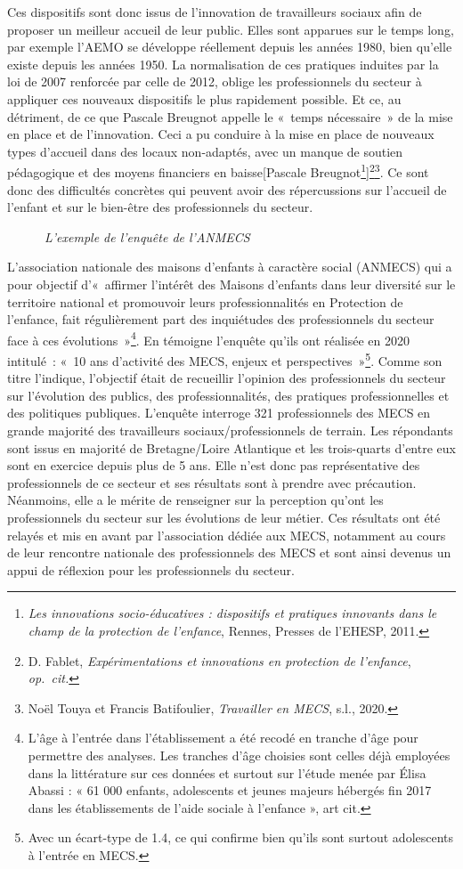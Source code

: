 \documentclass[
  12,
  a4paper,
]{report}
\begin{document}
Ces dispositifs sont donc issus de l'innovation de travailleurs sociaux
afin de proposer un meilleur accueil de leur public. Elles sont apparues
sur le temps long, par exemple l'AEMO se développe réellement depuis les
années 1980, bien qu'elle existe depuis les années 1950. La
normalisation de ces pratiques induites par la loi de 2007 renforcée par
celle de 2012, oblige les professionnels du secteur à appliquer ces
nouveaux dispositifs le plus rapidement possible. Et ce, au détriment,
de ce que Pascale Breugnot appelle le «~temps nécessaire~» de la mise en
place et de l'innovation. Ceci a pu conduire à la mise en place de
nouveaux types d'accueil dans des locaux non-adaptés, avec un manque de
soutien pédagogique et des moyens financiers en baisse{[}Pascale
Breugnot\footnote{\emph{Les innovations socio-éducatives : dispositifs
  et pratiques innovants dans le champ de la protection de l'enfance},
  {Rennes}, {Presses de l'EHESP}, 2011.}{]}\footnote{D. Fablet,
  \emph{Expérimentations et innovations en protection de l'enfance},
  \emph{op.~cit.}}\footnote{Noël Touya et Francis Batifoulier,
  \emph{Travailler en MECS}, s.l., 2020.}. Ce sont donc des difficultés
concrètes qui peuvent avoir des répercussions sur l'accueil de l'enfant
et sur le bien-être des professionnels du secteur.

~~~~~~\emph{L'exemple de l'enquête de l'ANMECS}

L'association nationale des maisons d'enfants à caractère social
(ANMECS) qui a pour objectif d'«~affirmer l'intérêt des Maisons
d'enfants dans leur diversité sur le territoire national et promouvoir
leurs professionnalités en Protection de l'enfance, fait régulièrement
part des inquiétudes des professionnels du secteur face à ces
évolutions~»\footnote{L'âge à l'entrée dans l'établissement a été recodé
  en tranche d'âge pour permettre des analyses. Les tranches d'âge
  choisies sont celles déjà employées dans la littérature sur ces
  données et surtout sur l'étude menée par Élisa Abassi : « 61 000
  enfants, adolescents et jeunes majeurs hébergés fin 2017 dans les
  établissements de l'aide sociale à l'enfance », art cit.}. En témoigne
l'enquête qu'ils ont réalisée en 2020 intitulé~: «~10 ans d'activité des
MECS, enjeux et perspectives~»\footnote{Avec un écart-type de 1.4, ce
  qui confirme bien qu'ils sont surtout adolescents à l'entrée en MECS.}.
Comme son titre l'indique, l'objectif était de recueillir l'opinion des
professionnels du secteur sur l'évolution des publics, des
professionnalités, des pratiques professionnelles et des politiques
publiques. L'enquête interroge 321 professionnels des MECS en grande
majorité des travailleurs sociaux/professionnels de terrain. Les
répondants sont issus en majorité de Bretagne/Loire Atlantique et les
trois-quarts d'entre eux sont en exercice depuis plus de 5 ans. Elle
n'est donc pas représentative des professionnels de ce secteur et ses
résultats sont à prendre avec précaution. Néanmoins, elle a le mérite de
renseigner sur la perception qu'ont les professionnels du secteur sur
les évolutions de leur métier. Ces résultats ont été relayés et mis en
avant par l'association dédiée aux MECS, notamment au cours de leur
rencontre nationale des professionnels des MECS et sont ainsi devenus un
appui de réflexion pour les professionnels du secteur.
\end{document}
